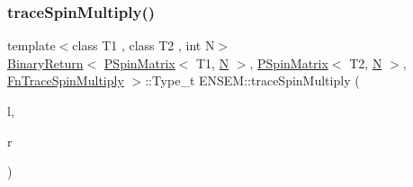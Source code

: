 \subsubsection{\texorpdfstring{traceSpinMultiply()}{traceSpinMultiply()}\hspace{0.1cm}{\footnotesize\ttfamily [1/3]}}
{\footnotesize\ttfamily template$<$class T1 , class T2 , int N$>$ \\
\mbox{\hyperlink{structENSEM_1_1BinaryReturn}{Binary\+Return}}$<$ \mbox{\hyperlink{classENSEM_1_1PSpinMatrix}{P\+Spin\+Matrix}}$<$ T1, \mbox{\hyperlink{operator__name__util_8cc_a7722c8ecbb62d99aee7ce68b1752f337}{N}} $>$, \mbox{\hyperlink{classENSEM_1_1PSpinMatrix}{P\+Spin\+Matrix}}$<$ T2, \mbox{\hyperlink{operator__name__util_8cc_a7722c8ecbb62d99aee7ce68b1752f337}{N}} $>$, \mbox{\hyperlink{structENSEM_1_1FnTraceSpinMultiply}{Fn\+Trace\+Spin\+Multiply}} $>$\+::Type\+\_\+t E\+N\+S\+E\+M\+::trace\+Spin\+Multiply (\begin{DoxyParamCaption}\item[{const \mbox{\hyperlink{classENSEM_1_1PSpinMatrix}{P\+Spin\+Matrix}}$<$ T1, \mbox{\hyperlink{operator__name__util_8cc_a7722c8ecbb62d99aee7ce68b1752f337}{N}} $>$ \&}]{l,  }\item[{const \mbox{\hyperlink{classENSEM_1_1PSpinMatrix}{P\+Spin\+Matrix}}$<$ T2, \mbox{\hyperlink{operator__name__util_8cc_a7722c8ecbb62d99aee7ce68b1752f337}{N}} $>$ \&}]{r }\end{DoxyParamCaption})\hspace{0.3cm}{\ttfamily [inline]}}

\mbox{\label{group__primspinmatrix_ga397616dd6ad517f1cf893903cd93c2c8}} 

